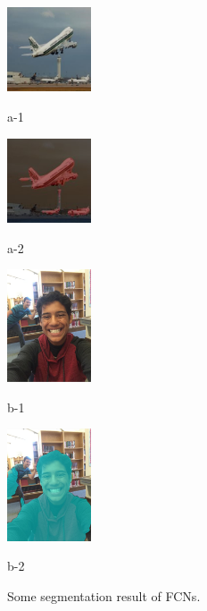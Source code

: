 \begin{figure}[ht]
    \centering
    \begin{minipage}[b]{2.5cm}
        \centering
        \includegraphics[width=2.5cm]{figs/Receptive_example_1_1.jpg}
        \caption*{a-1}
    \end{minipage}
    \mbox{\hspace{1cm}}
    \begin{minipage}[b]{2.5cm}
        \centering
        \includegraphics[width=2.5cm]{figs/Receptive_example_1_2.png}
        \caption*{a-2}
    \end{minipage}

    \begin{minipage}[b]{2.5cm}
        \centering
        \includegraphics[width=2.5cm]{figs/Receptive_example_2_1.png}
        \caption*{b-1}
    \end{minipage}
    \mbox{\hspace{1cm}}
    \begin{minipage}[b]{2.5cm}
        \centering
        \includegraphics[width=2.5cm]{figs/Receptive_example_2_2.png}
        \caption*{b-2}
    \end{minipage}
    \caption{Some segmentation result of FCNs.}
    \label{fig: Recveptive Example}
\end{figure}
